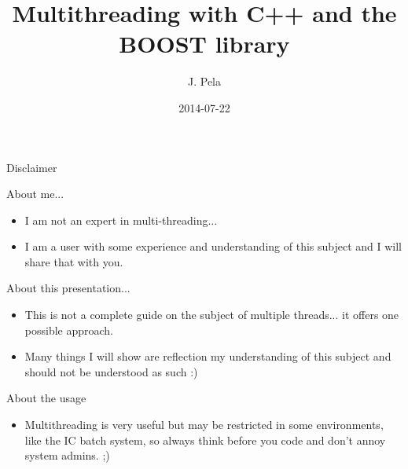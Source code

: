 \documentclass[8pt]{beamer}
\author[J. Pela]{J. Pela}
\title{Multithreading with C++ and the BOOST library}
\institute[ICL]{Imperial College London}
\date{2014-07-22}
\begin{document}
\setlength{\unitlength}{1mm}

\begin{frame}
  \titlepage
\end{frame}

\begin{frame}{Disclaimer}

\begin{block}{About me...}
 
\begin{itemize}
  \item I am not an expert in multi-threading... 
  \item I am a user with some experience and understanding of this subject and I will share that with you.
\end{itemize}

\end{block}

\begin{block}{About this presentation...}
 
\begin{itemize}
  \item This is not a complete guide on the subject of multiple threads... it offers one possible approach.
  \item Many things I will show are reflection my understanding of this subject and should not be understood as such :)
\end{itemize}

\end{block}

\begin{block}{About the usage}
 
\begin{itemize}
  \item Multithreading is very useful but may be restricted in some environments, like the IC batch system, so always think before you code and don't annoy system admins. ;)
\end{itemize}

\end{block}

\end{frame}
\end{document}

